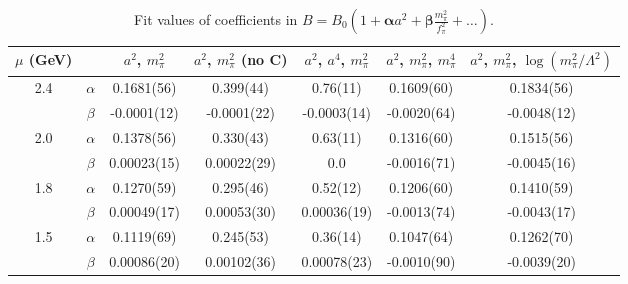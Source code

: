 \documentclass[12pt]{extarticle}
\begin{document}
\begin{table}[h!]
\begin{center}
\begin{tabular}{|c c|c|c|c|c|c|}
\hline
$\mu$ (GeV) &  & $a^2$, $m_\pi^2$& $a^2$, $m_\pi^2$ (no C)& $a^2$, $a^4$, $m_\pi^2$& $a^2$, $m_\pi^2$, $m_\pi^4$& $a^2$, $m_\pi^2$, $\log(m_\pi^2/\Lambda^2)$\\
\hline
\multirow{2}{0.5in}{2.4} & $\alpha$ & 0.1681(56)& 0.399(44)& 0.76(11)& 0.1609(60)& 0.1834(56)\\
 & $\beta$ & -0.0001(12)& -0.0001(22)& -0.0003(14)& -0.0020(64)& -0.0048(12)\\
\hline
\multirow{2}{0.5in}{2.0} & $\alpha$ & 0.1378(56)& 0.330(43)& 0.63(11)& 0.1316(60)& 0.1515(56)\\
 & $\beta$ & 0.00023(15)& 0.00022(29)& 0.0& -0.0016(71)& -0.0045(16)\\
\hline
\multirow{2}{0.5in}{1.8} & $\alpha$ & 0.1270(59)& 0.295(46)& 0.52(12)& 0.1206(60)& 0.1410(59)\\
 & $\beta$ & 0.00049(17)& 0.00053(30)& 0.00036(19)& -0.0013(74)& -0.0043(17)\\
\hline
\multirow{2}{0.5in}{1.5} & $\alpha$ & 0.1119(69)& 0.245(53)& 0.36(14)& 0.1047(64)& 0.1262(70)\\
 & $\beta$ & 0.00086(20)& 0.00102(36)& 0.00078(23)& -0.0010(90)& -0.0039(20)\\
\hline
\end{tabular}
\caption{Fit values of coefficients in $B = B_0(1 + \mathbf{\alpha} a^2 + \mathbf{\beta} \frac{m_\pi^2}{f_\pi^2} + \ldots)$.}
\end{center}
\end{table}




















\clearpage
\end{document}
